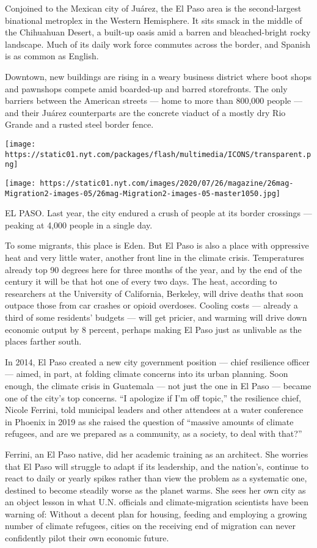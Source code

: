 Conjoined to the Mexican city of Juárez, the El Paso area is the
second-largest binational metroplex in the Western Hemisphere. It sits
smack in the middle of the Chihuahuan Desert, a built-up oasis amid a
barren and bleached-bright rocky landscape. Much of its daily work force
commutes across the border, and Spanish is as common as English.

Downtown, new buildings are rising in a weary business district where
boot shops and pawnshops compete amid boarded-up and barred storefronts.
The only barriers between the American streets --- home to more than
800,000 people --- and their Juárez counterparts are the concrete
viaduct of a mostly dry Rio Grande and a rusted steel border fence.

\texttt{[image: https://static01.nyt.com/packages/flash/multimedia/ICONS/transparent.png]}

\texttt{[image: https://static01.nyt.com/images/2020/07/26/magazine/26mag-Migration2-images-05/26mag-Migration2-images-05-master1050.jpg]}

EL PASO. Last year, the city endured a crush of people at its border
crossings --- peaking at 4,000 people in a single day.

To some migrants, this place is Eden. But El Paso is also a place with
oppressive heat and very little water, another front line in the climate
crisis. Temperatures already top 90 degrees here for three months of the
year, and by the end of the century it will be that hot one of every two
days. The heat, according to researchers at the University of
California, Berkeley, will drive deaths that soon outpace those from car
crashes or opioid overdoses. Cooling costs --- already a third of some
residents' budgets --- will get pricier, and warming will drive down
economic output by 8 percent, perhaps making El Paso just as unlivable
as the places farther south.

In 2014, El Paso created a new city government position --- chief
resilience officer --- aimed, in part, at folding climate concerns into
its urban planning. Soon enough, the climate crisis in Guatemala --- not
just the one in El Paso --- became one of the city's top concerns. ``I
apologize if I'm off topic,'' the resilience chief, Nicole Ferrini, told
municipal leaders and other attendees at a water conference in Phoenix
in 2019 as she raised the question of ``massive amounts of climate
refugees, and are we prepared as a community, as a society, to deal with
that?''

Ferrini, an El Paso native, did her academic training as an architect.
She worries that El Paso will struggle to adapt if its leadership, and
the nation's, continue to react to daily or yearly spikes rather than
view the problem as a systematic one, destined to become steadily worse
as the planet warms. She sees her own city as an object lesson in what
U.N. officials and climate-migration scientists have been warning of:
Without a decent plan for housing, feeding and employing a growing
number of climate refugees, cities on the receiving end of migration can
never confidently pilot their own economic future.

